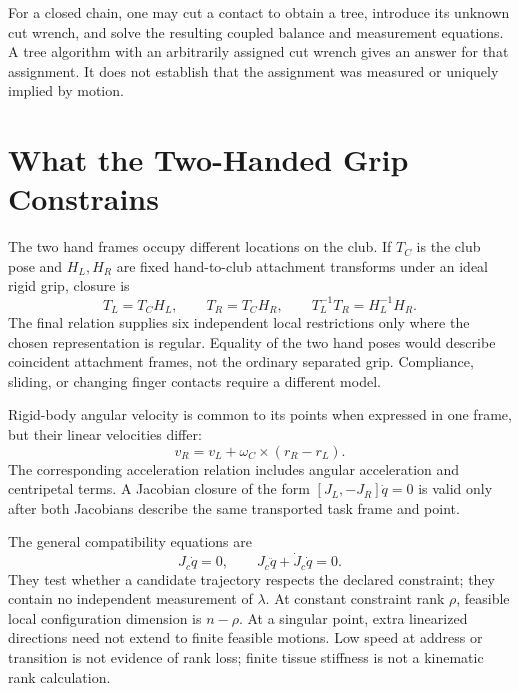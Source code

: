 For a closed chain, one may cut a contact to obtain a tree, introduce its unknown
cut wrench, and solve the resulting coupled balance and measurement equations.
A tree algorithm with an arbitrarily assigned cut wrench gives an answer for
that assignment. It does not establish that the assignment was measured or
uniquely implied by motion.

\section{What the Two-Handed Grip Constrains}
\label{sec:loop_closure_formal}

The two hand frames occupy different locations on the club. If $T_C$ is the club
pose and $H_L,H_R$ are fixed hand-to-club attachment transforms under an ideal
rigid grip, closure is
\begin{equation}
 T_L=T_CH_L,\qquad T_R=T_CH_R,
 \qquad T_L^{-1}T_R=H_L^{-1}H_R.
 \label{eq:loop_closure_spatial}
\end{equation}
The final relation supplies six independent local restrictions only where the
chosen representation is regular. Equality of the two hand poses would describe
coincident attachment frames, not the ordinary separated grip. Compliance,
sliding, or changing finger contacts require a different model.

Rigid-body angular velocity is common to its points when expressed in one
frame, but their linear velocities differ:
\begin{equation}
 v_R=v_L+\omega_C\times(r_R-r_L).
 \label{eq:separated_hand_velocities}
\end{equation}
The corresponding acceleration relation includes angular acceleration and
centripetal terms. A Jacobian closure of the form $[J_L,-J_R]\dot q=0$ is valid
only after both Jacobians describe the same transported task frame and point.

The general compatibility equations are
\begin{equation}
 J_c\dot q=0,\qquad
 J_c\ddot q+\dot J_c\dot q=0.
 \label{eq:constraint_acceleration}
\end{equation}
They test whether a candidate trajectory respects the declared constraint;
they contain no independent measurement of $\lambda$.
At constant constraint rank $\rho$, feasible local configuration dimension is
$n-\rho$.
At a singular point, extra linearized directions need not extend to finite
feasible motions. Low speed at address or transition is not evidence of rank
loss; finite tissue stiffness is not a kinematic rank calculation.

